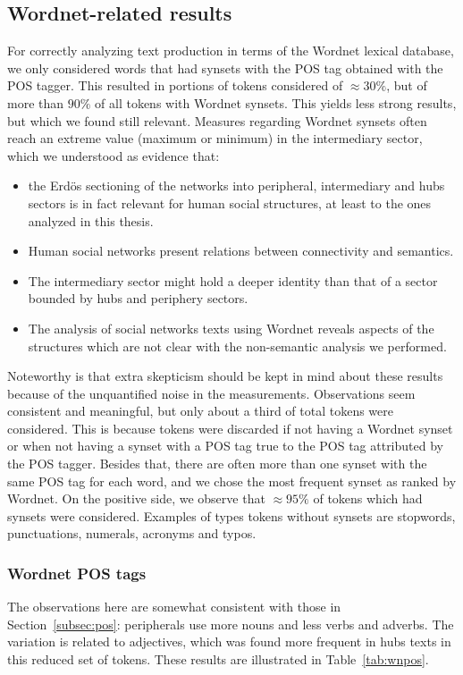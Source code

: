 \subsection{Wordnet-related results}
For correctly analyzing text production in terms of the Wordnet lexical database,
we only considered words that had synsets with the POS tag obtained with the POS tagger.
This resulted in portions of tokens considered of $\approx 30\%$,
but of more than $90\%$ of all tokens with Wordnet synsets.
This yields less strong results, but which we found still relevant.
Measures regarding Wordnet synsets often reach an extreme value (maximum or minimum)
in the intermediary sector, which we understood as evidence that:
\begin{itemize}
\item the Erd\"os sectioning of the networks into peripheral, intermediary and hubs sectors is in fact relevant for human social structures, at least to the ones analyzed in this thesis.
\item Human social networks present relations between connectivity and semantics.
\item The intermediary sector might hold a deeper identity than that of a sector bounded by hubs and periphery sectors.
\item The analysis of social networks texts using Wordnet reveals aspects of the structures which are not clear with the non-semantic analysis we performed.
\end{itemize}

Noteworthy is that extra skepticism should be kept in mind about these results
because of the unquantified noise in the measurements.
Observations seem consistent and meaningful, but only about a third of total tokens
were considered.
This is because tokens were discarded if not having a Wordnet synset
or when not having a synset with a POS tag true to the POS tag attributed by the POS tagger.
Besides that, there are often more than one synset with the same POS tag for each word,
and we chose the most frequent synset as ranked by Wordnet.
On the positive side, we observe that $\approx 95\%$ of tokens which had synsets
were considered.
Examples of types tokens without synsets are stopwords, punctuations, numerals, acronyms and typos.

\subsubsection{Wordnet POS tags}\label{subsec:wnpos}
The observations here are somewhat consistent with those in Section~\ref{subsec:pos}:
peripherals use more nouns and less verbs and adverbs.
The variation is related to adjectives, which was found more frequent in hubs texts
in this reduced set of tokens.
These results are illustrated in Table~\ref{tab:wnpos}.

\FloatBarrier


